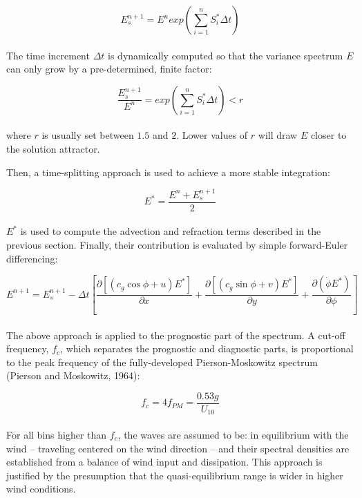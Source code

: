 \documentclass[letterpaper]{article}
\numberwithin{equation}{section}
\begin{document}
\begin{equation}
E^{n+1}_{s}=E^{n}exp\left(\displaystyle\sum_{i=1}^{n}S_{i}^{*}\Delta t\right)
\end{equation}
\\

The time increment $\Delta t$ is dynamically computed so that the variance spectrum $E$
can only grow by a pre-determined, finite factor:

\begin{equation}
\dfrac{E^{n+1}_{s}}{E^{n}}=exp\left(\displaystyle\sum_{i=1}^{n}S_{i}^{*}\Delta t\right)<r
\end{equation}
\\
where $r$ is usually set between $1.5$ and $2$.
Lower values of $r$ will draw $E$ closer to the solution attractor.

Then, a time-splitting approach is used to achieve a more stable integration:

\begin{equation}
E^{*}=\dfrac{E^{n}+E^{n+1}_{s}}{2}
\end{equation}
\\
$E^{*}$ is used to compute the advection and refraction terms described in the previous section.
Finally, their contribution is evaluated by simple forward-Euler differencing:

\begin{equation}
E^{n+1}=E^{n+1}_{s}-\Delta t\left[\dfrac{\partial [(c_{g}\cos{\phi}+u)E^{*}]}{\partial x} 
                                              +\dfrac{\partial [(c_{g}\sin{\phi}+v)E^{*}]}{\partial y}
                                              +\dfrac{\partial (\dot{\phi}E^{*})}{\partial \phi}\right]
\end{equation}
\\
The above approach is applied to the prognostic part of the spectrum.
A cut-off frequency, $f_{c}$, which separates the prognostic and diagnostic parts,
is proportional to the peak frequency of the fully-developed Pierson-Moskowitz spectrum (Pierson and Moskowitz, 1964):

\begin{equation}
f_{c}=4f_{PM}=\dfrac{0.53g}{U_{10}}
\end{equation}
\\
For all bins higher than $f_{c}$, the waves are assumed to be:  
in equilibrium with the wind -- traveling centered on the wind direction -- and their spectral densities are established
from a balance of wind input and dissipation. 
This approach is justified by the presumption that  
the quasi-equilibrium range is wider in higher wind conditions.
\end{document}
